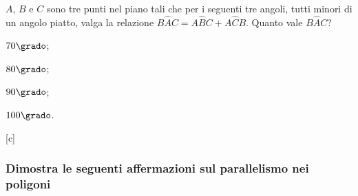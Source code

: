 \begin{esercizio}  %
\label{ese:3.21}
$A$, $B$ e $C$ sono tre punti nel piano tali che per i seguenti tre 
angoli, tutti minori di un angolo piatto, valga la relazione 
$B\widehat{A}C=A\widehat{B}C+A\widehat{C}B$. Quanto vale 
$B\widehat{A}C$?
\begin{multicols}{4}
\begin{enumeratea}
\item $70\grado$;
\item $80\grado$;
\item $90\grado$;
\item $100\grado$.
\end{enumeratea}
\end{multicols}
\hfill[c]
\end{esercizio}

\subsubsection*{Dimostra le seguenti affermazioni sul parallelismo 
nei poligoni}


